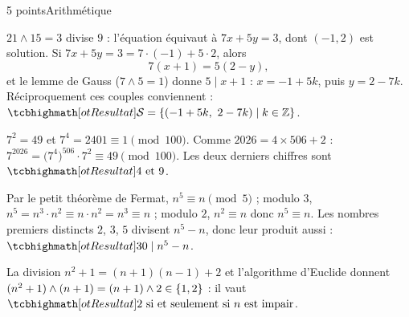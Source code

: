 

\begin{corrigeEval}{5 points}{Arithmétique}
\begin{questions}
  \item $21\wedge15=3$ divise $9$ : l'équation équivaut à $7x+5y=3$, dont
    $(-1,2)$ est solution. Si $7x+5y=3=7\cdot(-1)+5\cdot2$, alors
    \[7(x+1)=5(2-y),\]
    et le lemme de Gauss ($7\wedge5=1$) donne $5\mid x+1$ : $x=-1+5k$, puis
    $y=2-7k$. Réciproquement ces couples conviennent :
    $\res{\mathcal{S}=\ens{(-1+5k,\ 2-7k)\mid k\in\Z}}$. 
  \item $7^{2}=49$ et $7^{4}=2401\equiv1\pmod{100}$. Comme
    $2026=4\times506+2$ :
    $7^{2026}=\bigl(7^{4}\bigr)^{506}\cdot7^{2}\equiv49\pmod{100}$. Les deux
    derniers chiffres sont $\res{4\text{ et }9}$. \pts{1 pt}
  \item Par le petit théorème de Fermat, $n^{5}\equiv n\pmod5$ ; modulo $3$,
    $n^{5}=n^{3}\cdot n^{2}\equiv n\cdot n^{2}=n^{3}\equiv n$ ; modulo $2$,
    $n^{2}\equiv n$ donc $n^{5}\equiv n$. Les nombres premiers distincts
    $2$, $3$, $5$ divisent $n^{5}-n$, donc leur produit aussi :
    $\res{30\mid n^{5}-n}$. 
  \item La division $n^{2}+1=(n+1)(n-1)+2$ et l'algorithme d'Euclide
    donnent $(n^{2}+1)\wedge(n+1)=(n+1)\wedge2\in\left\{1,2\right\}$ : il vaut
    $\res{2\text{ si et seulement si }n\text{ est impair}}$. \pts{1 pt}
\end{questions}
\end{corrigeEval}

